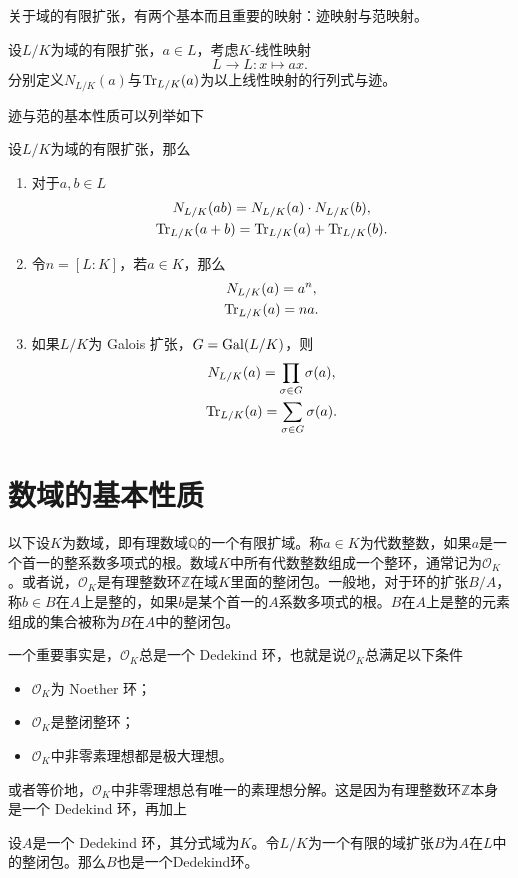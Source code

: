 关于域的有限扩张，有两个基本而且重要的映射：迹映射与范映射。

\begin{definition}
设$L/K$为域的有限扩张，$a\in L$，考虑$K$-线性映射
$$L \longrightarrow L: x\mapsto ax.$$
分别定义$N_{L/K}(a)$与$\operatorname{Tr}_{L/K}(a)$为以上线性映射的行列式与迹。
\end{definition}

迹与范的基本性质可以列举如下

\begin{proposition}
设$L/K$为域的有限扩张，那么
\begin{enumerate}
\item 对于$a,b\in L$
\begin{gather}
N_{L/K}(ab) = N_{L/K}(a)\cdot N_{L/K}(b), \\
\operatorname{Tr}_{L/K}(a+b) = \operatorname{Tr}_{L/K}(a) + \operatorname{Tr}_{L/K}(b).
\end{gather}
\item 令$n = [L:K]$，若$a\in K$，那么
\begin{gather}
N_{L/K}(a) = a^n, \\
\operatorname{Tr}_{L/K}(a) = na.
\end{gather}
\item 如果$L/K$为 Galois 扩张，$G = \operatorname{Gal}(L/K)$，则
\begin{gather}
N_{L/K}(a) = \prod\limits_{\sigma\in G} \sigma(a), \\
\operatorname{Tr}_{L/K}(a) = \sum\limits_{\sigma\in G} \sigma(a).
\end{gather}
\end{enumerate}
\end{proposition}

\section{数域的基本性质}
以下设$K$为数域，即有理数域$\mathbb{Q}$的一个有限扩域。称$a\in K$为代数整数，如果$a$是一个首一的整系数多项式的根。数域$K$中所有代数整数组成一个整环，通常记为$\mathcal{O}_K$。或者说，$\mathcal{O}_K$是有理整数环$\mathbb{Z}$在域$K$里面的整闭包。一般地，对于环的扩张$B/A$，称$b\in B$在$A$上是整的，如果$b$是某个首一的$A$系数多项式的根。$B$在$A$上是整的元素组成的集合被称为$B$在$A$中的整闭包。


一个重要事实是，$\mathcal{O}_K$总是一个 Dedekind 环，也就是说$\mathcal{O}_K$总满足以下条件
\begin{itemize}
\item $\mathcal{O}_K$为 Noether 环；
\item $\mathcal{O}_K$是整闭整环；
\item $\mathcal{O}_K$中非零素理想都是极大理想。
\end{itemize}
或者等价地，$\mathcal{O}_K$中非零理想总有唯一的素理想分解。这是因为有理整数环$\mathbb{Z}$本身是一个 Dedekind 环，再加上
\begin{theorem}
设$A$是一个 Dedekind 环，其分式域为$K$。令$L/K$为一个有限的域扩张$B$为$A$在$L$中的整闭包。那么$B$也是一个Dedekind环。
\end{theorem}

